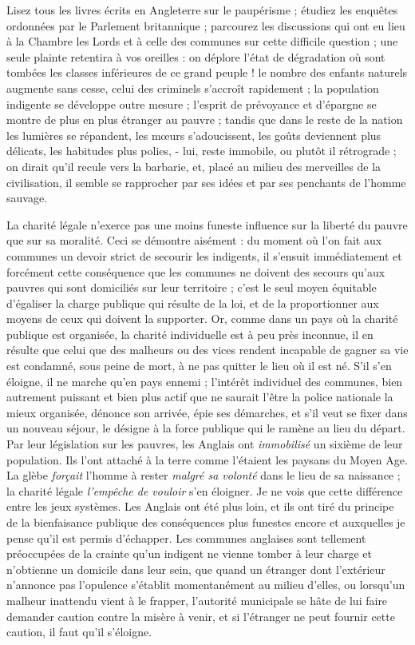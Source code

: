 \documentclass[french,twoside]{book} %
\begin{document}
Lisez tous les livres écrits en Angleterre sur le paupérisme ; étudiez les enquêtes ordonnées par le Parlement britannique ; parcourez les discussions qui ont eu lieu à la Chambre les Lords et à celle des communes sur cette difficile question ; une seule plainte retentira à vos oreilles : on déplore l’état de dégradation où sont tombées les classes inférieures de ce grand peuple ! le nombre des enfants naturels augmente sans cesse, celui des criminels s’accroît rapidement ; la population indigente se développe outre mesure ; l’esprit de prévoyance et d’épargne se montre de plus en plus étranger au pauvre ; tandis que dans le reste de la nation les lumières se répandent, les mœurs s’adoucissent, les goûts deviennent plus délicats, les habitudes plus polies, - lui, reste immobile, ou plutôt il rétrograde ; on dirait qu’il recule vers la barbarie, et, placé au milieu des merveilles de la civilisation, il semble se rapprocher par ses idées et par ses penchants de l’homme sauvage.\par
La charité légale n’exerce pas une moins funeste influence sur la liberté du pauvre que sur sa moralité. Ceci se démontre aisément : du moment où l’on fait aux communes un devoir strict de secourir les indigents, il s’ensuit immédiatement et forcément cette conséquence que les communes ne doivent des secours qu’aux pauvres qui sont domiciliés sur leur territoire ; c’est le seul moyen équitable d’égaliser la charge publique qui résulte de la loi, et de la proportionner aux moyens de ceux qui doivent la supporter. Or, comme dans un pays où la charité publique est organisée, la charité individuelle est à peu près inconnue, il en résulte que celui que des malheurs ou des vices rendent incapable de gagner sa vie est condamné, sous peine de mort, à ne pas quitter le lieu où il est né. S'il s’en éloigne, il ne marche qu’en pays ennemi ; l’intérêt individuel des communes, bien autrement puissant et bien plus actif que ne saurait l’être la police nationale la mieux organisée, dénonce son arrivée, épie ses démarches, et s’il veut se fixer dans un nouveau séjour, le désigne à la force publique qui le ramène au lieu du départ. Par leur législation sur les pauvres, les Anglais ont \emph{immobilisé} un sixième de leur population. Ils l’ont attaché à la terre comme l’étaient les paysans du Moyen Age. La glèbe \emph{forçait} l’homme à rester \emph{malgré sa volonté} dans le lieu de sa naissance ; la charité légale \emph{l’empêche de vouloir} s’en éloigner. Je ne vois que cette différence entre les jeux systèmes. Les Anglais ont été plus loin, et ils ont tiré du principe de la bienfaisance publique des conséquences plus funestes encore et auxquelles je pense qu’il est permis d’échapper. Les communes anglaises sont tellement préoccupées de la crainte qu’un indigent ne vienne tomber à leur charge et n’obtienne un domicile dans leur sein, que quand un étranger dont l’extérieur n’annonce pas l’opulence s’établit momentanément au milieu d’elles, ou lorsqu’un malheur inattendu vient à le frapper, l’autorité municipale se hâte de lui faire demander caution contre la misère à venir, et si l’étranger ne peut fournir cette caution, il faut qu’il s’éloigne.\par
\end{document}

